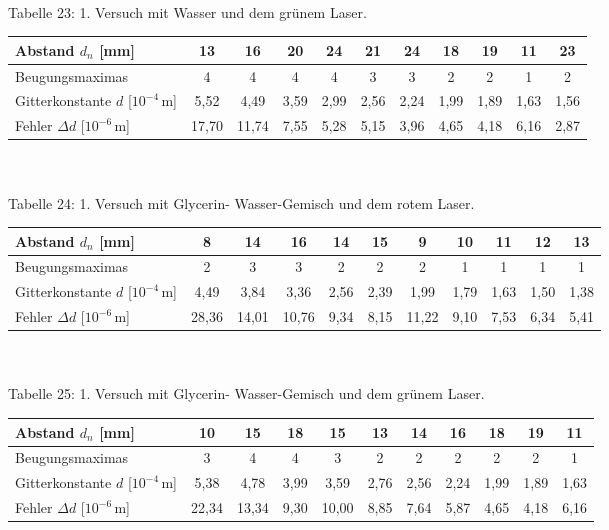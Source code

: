 \documentclass[fontsize=12pt]{scrartcl}
\begin{document}
~\\
Tabelle 23: 1. Versuch mit Wasser und dem grünem Laser. \\
\begin{tabular}{|l|c|c|c|c|c|c|c|c|c|c|} \hline
Abstand $d_n$ [mm] & 13 & 16 & 20 & 24 & 21 & 24 & 18 & 19 & 11 & 23 \\ \hline
Beugungsmaximas & 4 & 4 & 4 & 4 & 3 & 3 & 2 & 2 & 1 & 2 \\ \hline 
Gitterkonstante $d$ [$10^{-4}$\,m] & 5,52 & 4,49 & 3,59 & 2,99 & 2,56 & 2,24 & 1,99 & 1,89 & 1,63 & 1,56 \\ \hline 
Fehler $\Delta d$ [$10^{-6}$\,m]  & 17,70 & 11,74 & 7,55  & 5,28 & 5,15 & 3,96 & 4,65 & 4,18 & 6,16 & 2,87 \\ \hline
\end{tabular} \\

~\\
Tabelle 24: 1. Versuch mit Glycerin- Wasser-Gemisch und dem rotem Laser. \\
\begin{tabular}{|l|c|c|c|c|c|c|c|c|c|c|} \hline
Abstand $d_n$ [mm] & 8 & 14 & 16 & 14 & 15 & 9 & 10 & 11 & 12 & 13 \\ \hline
Beugungsmaximas & 2 & 3 & 3 & 2 & 2 & 2 & 1 & 1 & 1 & 1 \\ \hline 
Gitterkonstante $d$ [$10^{-4}$\,m] &4,49 & 3,84 & 3,36 & 2,56 & 2,39 & 1,99 & 1,79 & 1,63 & 1,50 & 1,38 \\ \hline
Fehler $\Delta d$ [$10^{-6}$\,m]  &  28,36 & 14,01 & 10,76 & 9,34 & 8,15 & 11,22 & 9,10 & 7,53 & 6,34 & 5,41 \\ \hline
\end{tabular} \\

~\\
Tabelle 25: 1. Versuch mit Glycerin- Wasser-Gemisch und dem grünem Laser. \\
\begin{tabular}{|l|c|c|c|c|c|c|c|c|c|c|} \hline
Abstand $d_n$ [mm] & 10 & 15 & 18 & 15 & 13 & 14 & 16 & 18 & 19 & 11 \\ \hline
Beugungsmaximas & 3 & 4 & 4 & 3 & 2 & 2 & 2 & 2 & 2 & 1 \\ \hline 
Gitterkonstante $d$ [$10^{-4}$\,m] & 5,38 & 4,78 & 3,99 & 3,59 & 2,76 & 2,56 & 2,24 & 1,99 &  1,89  & 1,63  \\ \hline
Fehler $\Delta d$ [$10^{-6}$\,m]  & 22,34 & 13,34  & 9,30 & 10,00 & 8,85 & 7,64 & 5,87 & 4,65 & 4,18 & 6,16  \\ \hline
\end{tabular} \\
\end{document}
